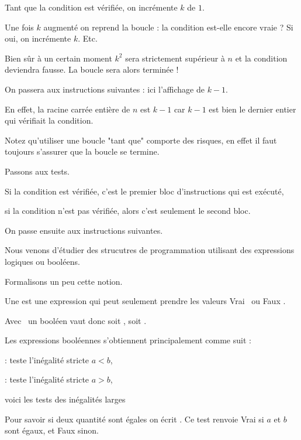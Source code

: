 Tant que la condition est vérifiée,
on incrémente $k$ de $1$.

Une fois $k$ augmenté on reprend la boucle : la condition est-elle encore 
vraie ? Si oui, on incrémente $k$. Etc.

Bien sûr à un certain moment $k^2$ sera strictement supérieur à $n$ et 
la condition deviendra fausse. La boucle sera alors terminée !

\change
On passera aux instructions suivantes : ici l'affichage de $k-1$.

\change
En effet, la racine carrée entière de $n$ est $k-1$ car $k-1$ est bien le dernier entier qui vérifiait la condition.

Notez qu'utiliser une boucle "tant que" comporte des risques, 
en effet il faut toujours s'assurer que la boucle se termine.


\diapo


\change
Passons aux tests.

Si la condition est vérifiée, c'est le premier bloc d'instructions 
qui est exécuté,

si la condition n'est pas vérifiée, alors c'est seulement le second bloc. 

On passe ensuite aux instructions suivantes.

\diapo

Nous venons d'étudier des strucutres de programmation utilisant des expressions logiques ou booléens.

Formalisons un peu cette notion.

\change
Une  est une expression
qui peut seulement prendre les valeurs  \og Vrai  \fg\
ou \og Faux  \fg.

Avec \Sage\ un booléen vaut donc soit , soit 
.

\change
Les expressions booléennes s'obtiennent 
principalement comme suit :


\change
{} : teste l'inégalité stricte $a<b$,


\change
{} : teste l'inégalité stricte $a>b$,

\change
\change  
voici les tests des inégalités larges

\change
Pour savoir si deux quantité sont égales on écrit
.
Ce test renvoie Vrai si $a$ et $b$ sont égaux, et Faux sinon.

